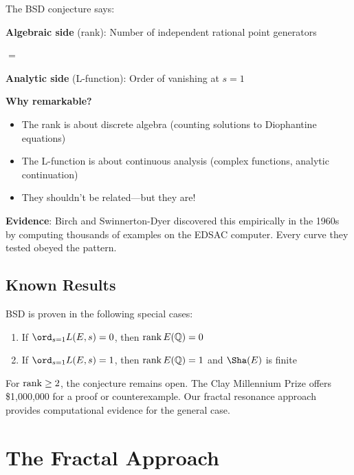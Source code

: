 \begin{intuitive}
The BSD conjecture says:

\textbf{Algebraic side} (rank): Number of independent rational point generators

$=$

\textbf{Analytic side} (L-function): Order of vanishing at $s = 1$

\textbf{Why remarkable?}
\begin{itemize}
\item The rank is about discrete algebra (counting solutions to Diophantine equations)
\item The L-function is about continuous analysis (complex functions, analytic continuation)
\item They shouldn't be related—but they are!
\end{itemize}

\textbf{Evidence}: Birch and Swinnerton-Dyer discovered this empirically in the 1960s by computing thousands of examples on the EDSAC computer. Every curve they tested obeyed the pattern.
\end{intuitive}

\subsection{Known Results}

\begin{theorem}\label{thm:gross-zagier-kolyvagin}
BSD is proven in the following special cases\cite{gross1986heegner,kolyvagin1988finiteness}:
\begin{enumerate}
\item If $\ord_{s=1} L(E,s) = 0$, then $\rank E(\mathbb{Q}) = 0$
\item If $\ord_{s=1} L(E,s) = 1$, then $\rank E(\mathbb{Q}) = 1$ and $\Sha(E)$ is finite
\end{enumerate}
\end{theorem}

\begin{remark}
For $\rank \geq 2$, the conjecture remains open. The Clay Millennium Prize offers \$1,000,000 for a proof or counterexample. Our fractal resonance approach provides computational evidence for the general case.
\end{remark}

\section{The Fractal Approach}

